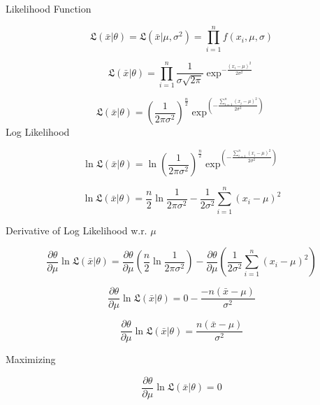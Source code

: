 \documentclass[12pt]{report}
\begin{document}
Likelihood Function

\begin{equation}
\mathfrak{L}(\bar{x}|\theta) = \mathfrak{L}(\bar{x}|\mu, \sigma^2) = \prod_{i=1}^n f(x_i, \mu, \sigma) 
\end{equation}

\begin{equation}
\mathfrak{L}(\bar{x}|\theta) = \prod_{i=1}^{n} \frac{1}{\sigma\sqrt{2\pi}} \exp^{-\frac{(x_i - \mu)^2}{2\sigma^2}}
\end{equation}

\begin{equation}
\mathfrak{L}(\bar{x}|\theta) = \left(\frac{1}{2\pi\sigma^2}\right)^{\frac{n}{2}} \exp^{\left( -\frac{\sum_{i=1}^n (x_i - \mu)^2}{2\sigma^2}\right)}
\end{equation}
Log Likelihood

\begin{equation}
\ln \mathfrak{L}(\bar{x}|\theta) = \ln \left(\frac{1}{2\pi\sigma^2}\right)^{\frac{n}{2}} \exp^{\left( -\frac{\sum_{i=1}^n (x_i - \mu)^2}{2\sigma^2}\right)}
\end{equation}

\begin{equation}
\ln \mathfrak{L}(\bar{x}|\theta) = \frac{n}{2} \ln \frac{1}{2\pi\sigma^2} - \frac{1}{2\sigma^2} \sum_{i=1}^n (x_i - \mu)^2
\end{equation}


Derivative of Log Likelihood w.r. $\mu$

\begin{equation}
\frac{\partial \theta}{\partial \mu} \ln \mathfrak{L}(\bar{x}|\theta) = \frac{\partial \theta}{\partial \mu} \left( \frac{n}{2} \ln \frac{1}{2\pi\sigma^2}\right) - \frac{\partial \theta}{\partial \mu} \left(\frac{1}{2\sigma^2} \sum_{i=1}^n (x_i - \mu)^2\right)
\end{equation}


\begin{equation}
\frac{\partial \theta}{\partial \mu} \ln \mathfrak{L}(\bar{x}|\theta) = 0 - \frac{-n \left(\bar{x} - \mu\right)}{\sigma^2}
\end{equation}

\begin{equation}
\frac{\partial \theta}{\partial \mu} \ln \mathfrak{L}(\bar{x}|\theta) = \frac{n \left(\bar{x} - \mu\right)}{\sigma^2}
\end{equation}

Maximizing

\begin{equation}
\frac{\partial \theta}{\partial \mu} \ln \mathfrak{L}(\bar{x}|\theta) = 0 
\end{equation}
\end{document}
